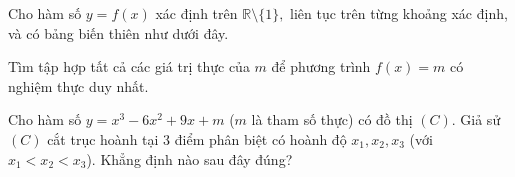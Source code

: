 \documentclass[12pt,a4paper]{article}
\begin{document}
\begin{ex}%
Cho hàm số $y=f(x)$ xác định trên $\mathbb{R}\setminus \{1\},$ liên tục trên từng khoảng xác định, và có bảng biến thiên như dưới đây.
\begin{center}
\end{center}
Tìm tập hợp tất cả các giá trị thực của $m$ để phương trình $f(x)=m$ có nghiệm thực duy nhất.
\choice{$[0;+\infty)\cup \{-1\}$}{\True $(0;+\infty)\cup \{-1\}$}{$(0;+\infty)$}{$[0;+\infty)$}
\end{ex}
\begin{ex}%
Cho hàm số $y=x^3-6x^2+9x+m$ ($m$ là tham số thực) có đồ thị $(C)$. Giả sử $(C)$ cắt trục hoành tại 3 điểm phân biệt có hoành độ $x_1,x_2,x_3$ (với $x_1<x_2<x_3$). Khẳng định nào sau đây đúng?
\end{ex}
\end{document}
